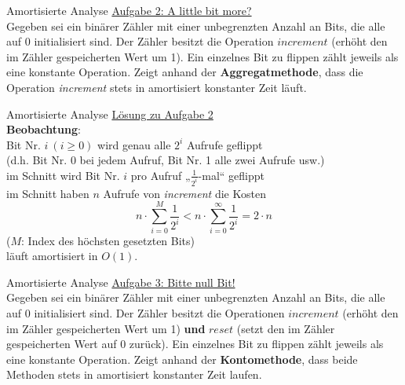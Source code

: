 \begin{frame}{Amortisierte Analyse}
	\underline{Aufgabe 2: A little bit more?} \\
	Gegeben sei ein binärer Zähler mit einer unbegrenzten Anzahl an Bits, die alle auf 0 initialisiert sind. Der Zähler besitzt die Operation $increment$ (erhöht den im Zähler gespeicherten Wert um 1). Ein einzelnes Bit zu flippen zählt jeweils als eine konstante Operation. Zeigt anhand der \textbf{Aggregatmethode}, dass die Operation \emph{increment} stets in amortisiert konstanter Zeit läuft.
\end{frame}

\begin{frame}{Amortisierte Analyse}
	\underline{Lösung zu Aufgabe 2} \\
	\textbf{Beobachtung}: \\
	Bit Nr. $i\ (i \geq 0)$ wird genau alle $2^i$ Aufrufe geflippt \\
	{\small \hanging (d.h. Bit Nr. 0 bei jedem Aufruf, Bit Nr. 1 alle zwei Aufrufe usw.)} \\
	\pause
	\impl im Schnitt wird Bit Nr. $i$ pro Aufruf „$\frac{1}{2^i}$-mal“ geflippt \\
	\pause
	\impl im Schnitt haben $n$ Aufrufe von \textit{increment} die Kosten \[
		n \cdot \sum\limits_{i=0}^{M} \frac{1}{2^i} < n \cdot \sum\limits_{i=0}^{\infty} \frac{1}{2^i} = 2 \cdot n
	\] ($M$: Index des höchsten gesetzten Bits) \\
	\pause
	\impl läuft amortisiert in $O(1)$.
\end{frame}



\begin{frame}{Amortisierte Analyse}
	\underline{Aufgabe 3: Bitte null Bit!} \\
	Gegeben sei ein binärer Zähler mit einer unbegrenzten Anzahl an Bits, die alle auf 0 initialisiert sind. Der Zähler besitzt die Operationen $increment$ (erhöht den im Zähler gespeicherten Wert um 1) \textbf{und} $reset$ (setzt den im Zähler gespeicherten Wert auf 0 zurück). Ein einzelnes Bit zu flippen zählt jeweils als eine konstante Operation. Zeigt anhand der \textbf{Kontomethode}, dass beide Methoden stets in amortisiert konstanter Zeit laufen.
\end{frame}

